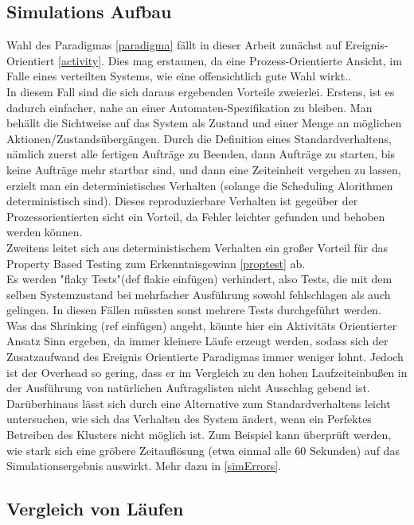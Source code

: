 \subsection{Simulations Aufbau}
Wahl des Paradigmas \ref{paradigma} fällt in dieser Arbeit zunächst auf Ereignis-Orientiert \ref{activity}. Dies mag erstaunen, da eine Prozess-Orientierte Ansicht, im Falle eines verteilten Systems, wie eine offensichtlich gute Wahl wirkt..\\
In diesem Fall sind die sich daraus ergebenden Vorteile zweierlei. Erstens, ist es dadurch einfacher, nahe an einer Automaten-Spezifikation zu bleiben. Man behällt die Sichtweise auf das System als Zustand und einer Menge an möglichen Aktionen/Zustandsübergängen. Durch die Definition eines Standardverhaltens, nämlich zuerst alle fertigen Aufträge zu Beenden, dann Aufträge zu starten, bis keine Aufträge mehr startbar sind, und dann eine Zeiteinheit vergehen zu lassen, erzielt man ein deterministisches Verhalten (solange die Scheduling Alorithmen deterministisch sind). Dieses reproduzierbare Verhalten ist gegeüber der Prozessorientierten sicht ein Vorteil, da Fehler leichter gefunden und behoben werden können.\\
Zweitens leitet sich aus deterministischem Verhalten ein großer Vorteil für das Property Based Testing zum Erkenntnisgewinn \ref{proptest} ab.\\
Es werden "flaky Tests"(def flakie einfügen) verhindert, also Tests, die mit dem selben Systemzustand bei mehrfacher Ausführung sowohl fehlschlagen als auch gelingen. In diesen Fällen müssten sonst mehrere Tests durchgeführt werden.\\
Was das Shrinking (ref einfügen) angeht, könnte hier ein  Aktivitäts Orientierter Ansatz Sinn ergeben, da immer kleinere Läufe erzeugt werden, sodass sich der Zusatzaufwand des Ereignis Orientierte Paradigmas immer weniger lohnt. Jedoch ist der Overhead so gering, dass er im Vergleich zu den hohen Laufzeiteinbußen in der Ausführung von natürlichen Auftragslisten nicht Ausschlag gebend ist.\\
Darüberhinaus lässt sich durch eine Alternative zum Standardverhaltens leicht untersuchen, wie sich das Verhalten des System ändert, wenn ein Perfektes Betreiben des Klusters nicht möglich ist. Zum Beispiel kann überprüft werden, wie stark sich eine gröbere Zeitauflösung (etwa einmal alle 60 Sekunden) auf das Simulationsergebnis auswirkt. Mehr dazu in \ref{simErrors}.


\subsection{Vergleich von Läufen}
